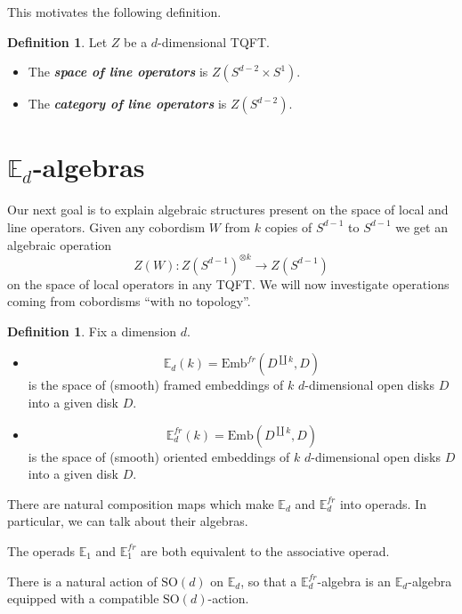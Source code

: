 \documentclass[10pt]{amsart}
\newcommand{\bE}{\mathbb{E}}
\newcommand{\Emb}{\mathrm{Emb}}
\newcommand{\SO}{\mathrm{SO}}
\newcommand{\defterm}[1]{\textbf{\emph{#1}}}
\theoremstyle{definition}
\theoremstyle{definition}
\newtheorem{defn}[thm]{Definition}
\begin{document}
This motivates the following definition.

\begin{defn}
Let $Z$ be a $d$-dimensional TQFT.
\begin{itemize}
\item The \defterm{space of line operators} is $Z(S^{d-2}\times S^1)$.
\item The \defterm{category of line operators} is $Z(S^{d-2})$.
\end{itemize}
\end{defn}

\section{$\bE_d$-algebras}

Our next goal is to explain algebraic structures present on the space of local and line operators. Given any cobordism $W$ from $k$ copies of $S^{d-1}$ to $S^{d-1}$ we get an algebraic operation
\[Z(W)\colon Z(S^{d-1})^{\otimes k}\longrightarrow Z(S^{d-1})\]
on the space of local operators in any TQFT. We will now investigate operations coming from cobordisms ``with no topology''.

\begin{defn}
Fix a dimension $d$.
\begin{itemize}
\item \[\bE_d(k) = \Emb^{fr}(D^{\coprod k}, D)\]
is the space of (smooth) framed embeddings of $k$ $d$-dimensional open disks $D$ into a given disk $D$.

\item \[\bE^{fr}_d(k) = \Emb(D^{\coprod k}, D)\]
is the space of (smooth) oriented embeddings of $k$ $d$-dimensional open disks $D$ into a given disk $D$.
\end{itemize}
\end{defn}

There are natural composition maps which make $\bE_d$ and $\bE^{fr}_d$ into operads. In particular, we can talk about their algebras.

\begin{example}
The operads $\bE_1$ and $\bE^{fr}_1$ are both equivalent to the associative operad.
\end{example}

\begin{example}
There is a natural action of $\SO(d)$ on $\bE_d$, so that a $\bE^{fr}_d$-algebra is an $\bE_d$-algebra equipped with a compatible $\SO(d)$-action.
\end{example}
\end{document}
